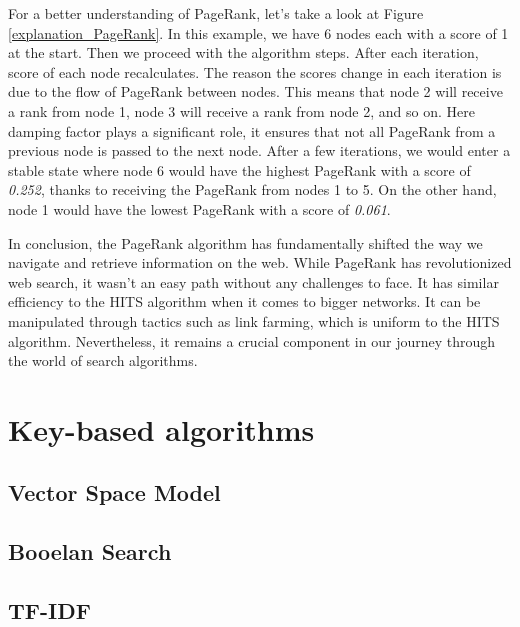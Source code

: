\documentclass[10pt,english,a4paper]{article}
\begin{document}
For a better understanding of PageRank, let's take a look at Figure \ref{explanation_PageRank}. In this example, we have 6 nodes each with a score of 1 at the start. Then we proceed with the algorithm steps. After each iteration, score of each node recalculates. The reason the scores change in each iteration is due to the flow of PageRank between nodes. This means that node 2 will receive a rank from node 1, node 3 will receive a rank from node 2, and so on. Here damping factor plays a significant role, it ensures that not all PageRank from a previous node is passed to the next node. After a few iterations, we would enter a stable state where node 6 would have the highest PageRank with a score of \textit{0.252}, thanks to receiving the PageRank from nodes 1 to 5. On the other hand, node 1 would have the lowest PageRank with a score of \textit{0.061}.

In conclusion, the PageRank algorithm has fundamentally shifted the way we navigate and retrieve information on the web. While PageRank has revolutionized web search, it wasn't an easy path without any challenges to face. It has similar efficiency to the HITS algorithm when it comes to bigger networks. It can be manipulated through tactics such as link farming, which is uniform to the HITS algorithm. Nevertheless, it remains a crucial component in our journey through the world of search algorithms.
\section{Key-based algorithms}
\subsection{Vector Space Model}
\subsection{Booelan Search}
\subsection{TF-IDF}
 

\end{document}

